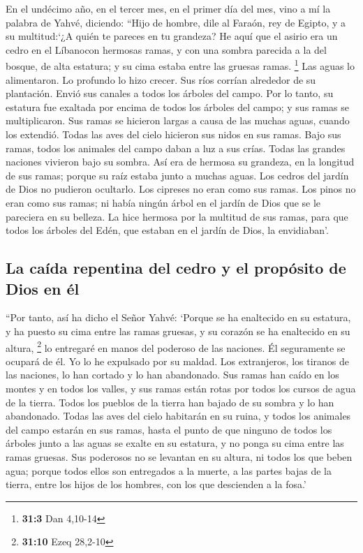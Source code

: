  En el undécimo año, en el tercer mes, en el primer día
del mes, vino a mí la palabra de Yahvé, diciendo:  ``Hijo
de hombre, dile al Faraón, rey de Egipto, y a su multitud:`¿A quién te
pareces en tu grandeza?  He aquí que el asirio era un
cedro en el Líbanocon hermosas ramas, y con una sombra parecida a la del
bosque, de alta estatura; y su cima estaba entre las gruesas ramas.
\footnote{\textbf{31:3} Dan 4,10-14}  Las aguas lo
alimentaron. Lo profundo lo hizo crecer. Sus ríos corrían alrededor de
su plantación. Envió sus canales a todos los árboles del campo.
 Por lo tanto, su estatura fue exaltada por encima de
todos los árboles del campo; y sus ramas se multiplicaron. Sus ramas se
hicieron largas a causa de las muchas aguas, cuando los extendió.
 Todas las aves del cielo hicieron sus nidos en sus ramas.
Bajo sus ramas, todos los animales del campo daban a luz a sus crías.
Todas las grandes naciones vivieron bajo su sombra.  Así
era de hermosa su grandeza, en la longitud de sus ramas; porque su raíz
estaba junto a muchas aguas.  Los cedros del jardín de
Dios no pudieron ocultarlo. Los cipreses no eran como sus ramas. Los
pinos no eran como sus ramas; ni había ningún árbol en el jardín de Dios
que se le pareciera en su belleza.  La hice hermosa por la
multitud de sus ramas, para que todos los árboles del Edén, que estaban
en el jardín de Dios, la envidiaban'.

\hypertarget{la-cauxedda-repentina-del-cedro-y-el-propuxf3sito-de-dios-en-uxe9l}{%
\subsection{La caída repentina del cedro y el propósito de Dios en
él}\label{la-cauxedda-repentina-del-cedro-y-el-propuxf3sito-de-dios-en-uxe9l}}

 ``Por tanto, así ha dicho el Señor Yahvé: `Porque se ha
enaltecido en su estatura, y ha puesto su cima entre las ramas gruesas,
y su corazón se ha enaltecido en su altura, \footnote{\textbf{31:10}
  Ezeq 28,2-10}  lo entregaré en manos del poderoso de
las naciones. Él seguramente se ocupará de él. Yo lo he expulsado por su
maldad.  Los extranjeros, los tiranos de las naciones, lo
han cortado y lo han abandonado. Sus ramas han caído en los montes y en
todos los valles, y sus ramas están rotas por todos los cursos de agua
de la tierra. Todos los pueblos de la tierra han bajado de su sombra y
lo han abandonado.  Todas las aves del cielo habitarán en
su ruina, y todos los animales del campo estarán en sus ramas,
 hasta el punto de que ninguno de todos los árboles junto
a las aguas se exalte en su estatura, y no ponga su cima entre las ramas
gruesas. Sus poderosos no se levantan en su altura, ni todos los que
beben agua; porque todos ellos son entregados a la muerte, a las partes
bajas de la tierra, entre los hijos de los hombres, con los que
descienden a la fosa.'

